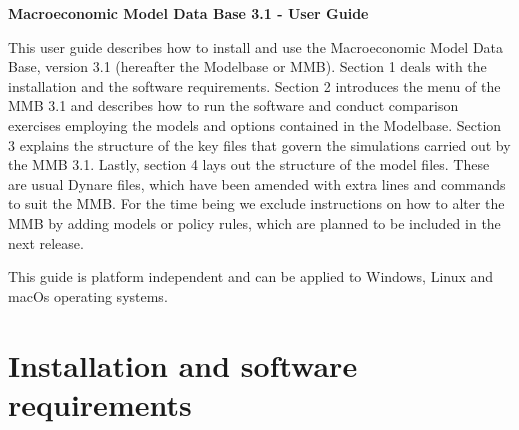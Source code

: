 \documentclass[11pt,a4paper]{article}
\begin{document}


\begin{center}
{\Large \textbf{Macroeconomic Model Data Base 3.1 - User Guide } }
\par\end{center}


\vspace{1.5cm}


\noindent This user guide describes how to install and use the Macroeconomic Model Data Base, version 3.1 (hereafter the Modelbase or MMB). Section 1 deals with the installation and the software requirements.
Section 2 introduces the menu of the MMB 3.1 and describes how to run the software and conduct comparison exercises employing the models and options contained in the Modelbase.
Section 3 explains the structure of the key files that govern the simulations carried out by the MMB 3.1. Lastly, section 4 lays out the structure of the model files. These are usual Dynare files, which have been amended with extra lines and commands to suit the MMB.
For the time being we exclude instructions on how to alter the MMB by adding models or policy rules, which are planned to be included in the next release.

This guide is platform independent and can be applied to Windows, Linux and macOs operating systems.


%
%
%
\section{Installation and software requirements}\label{sec:installation}
\vspace{0.5cm}

\end{document}
